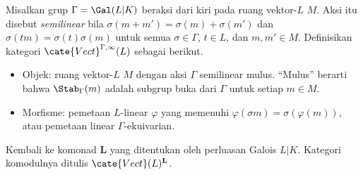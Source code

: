 \begin{definition}\label{def:semilinear-action}
	Misalkan grup $\Gamma=\Gal(L|K)$ beraksi dari kiri pada ruang vektor-$L$
	$M$. Aksi itu disebut \emph{semilinear} bila
	$\sigma(m+m')=\sigma(m)+\sigma(m')$ dan
	$\sigma(tm)=\sigma(t)\sigma(m)$ untuk semua $\sigma\in\Gamma$, $t\in L$,
	dan $m,m'\in M$. Definisikan kategori
	$\cate{Vect}^{\Gamma,\infty}(L)$ sebagai berikut.
	\begin{itemize}
		\item Objek: ruang vektor-$L$ $M$ dengan aksi $\Gamma$ semilinear
		mulus. ``Mulus'' berarti bahwa $\Stab_\Gamma(m)$ adalah subgrup buka
		dari $\Gamma$ untuk setiap $m\in M$.
		\item Morfisme: pemetaan $L$-linear $\varphi$ yang memenuhi
		$\varphi(\sigma m)=\sigma(\varphi(m))$, atau pemetaan linear
		$\Gamma$-ekuivarian.
	\end{itemize}
\end{definition}

Kembali ke komonad $\mathbf{L}$ yang ditentukan oleh perluasan Galois $L|K$.
Kategori komodulnya ditulis $\cate{Vect}(L)^{\mathbf{L}}$.


